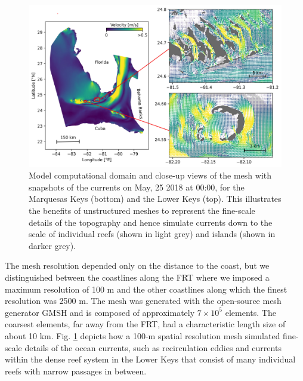 \begin{figure}
    \centering
    \includegraphics[width=.95\textwidth]{chapters/sctld/figures/vel.jpg}
    \caption{Model computational domain and close-up views of the mesh with snapshots of the currents on May, 25 2018 at 00:00, for the Marquesas Keys (bottom) and the Lower Keys (top). This illustrates the benefits of unstructured meshes to represent the fine-scale details of the topography and hence simulate currents down to the scale of individual reefs (shown in light grey) and islands (shown in darker grey).}
    \label{fig:setup}
\end{figure}

The mesh resolution depended only on the distance to the coast, but we distinguished between the coastlines along the FRT where we imposed a maximum resolution of 100 m and the other coastlines along which the finest resolution was 2500 m. The mesh was generated with the open-source mesh generator GMSH \citep{geuzaine2009gmsh} and is composed of approximately $7 \times 10^5$ elements. The coarsest elements, far away from the FRT, had a characteristic length size of about 10 km. Fig. \ref{fig:setup} depicts how a 100-m spatial resolution mesh simulated fine-scale details of the ocean currents, such as recirculation eddies and currents within the dense reef system in the Lower Keys that consist of many individual reefs with narrow passages in between. 

